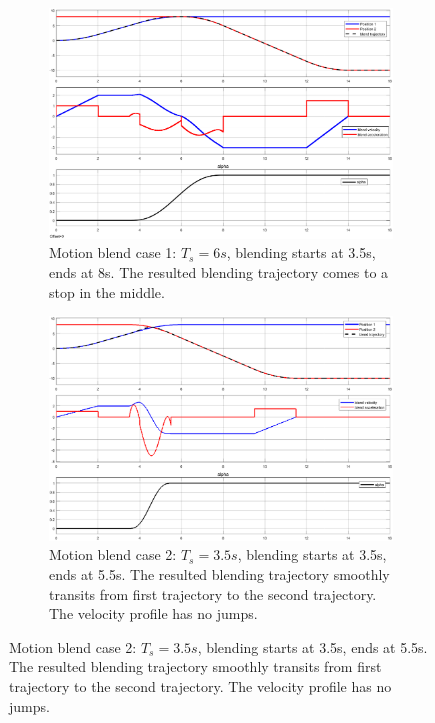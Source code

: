 \documentclass{article}
\begin{document}
\begin{figure}[ht]
	\vspace*{-5mm}
	\centering
	\begin{subfigure}[ht]{0.8\textwidth}%
		\centering
		\includegraphics[width=0.8\columnwidth]{figure/blend_case_1.eps}%
		\caption{Motion blend case 1: $T_s = 6s$, blending starts at 3.5s, ends at 8s. The resulted blending trajectory comes to a stop in the middle.}%
		\label{blend_case_1}%
	\end{subfigure}

	\begin{subfigure}[ht]{0.8\textwidth}%
		\centering
		\includegraphics[width=0.8\columnwidth]{figure/blend_case_2.eps}%
		\caption{Motion blend case 2: $T_s = 3.5s$, blending starts at 3.5s, ends at 5.5s. The resulted blending trajectory smoothly transits from first trajectory to the second trajectory. The velocity profile has no jumps.}%
		\label{blend_case_2}%
	\end{subfigure}


\end{figure}
\end{document}
